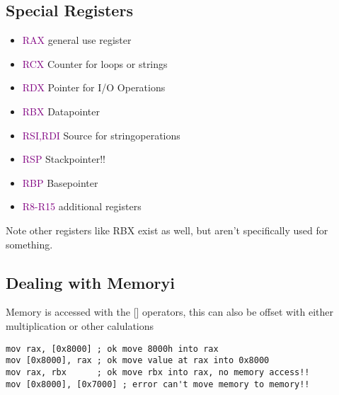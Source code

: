 \documentclass[main.tex,fontsize=8pt,paper=a4,paper=landscape,DIV=calc,]{scrartcl}
\begin{document}
\begin{multicols*}{4}
\subsection{Special Registers}
\begin{itemize}
  \item \textcolor{purple}{RAX} general use register
  \item \textcolor{purple}{RCX} Counter for loops or strings
  \item \textcolor{purple}{RDX} Pointer for I/O Operations
  \item \textcolor{purple}{RBX} Datapointer
  \item \textcolor{purple}{RSI,RDI} Source for stringoperations
  \item \textcolor{purple}{RSP} Stackpointer!!
  \item \textcolor{purple}{RBP} Basepointer
  \item \textcolor{purple}{R8-R15} additional registers
\end{itemize}
Note other registers like RBX exist as well, but aren't specifically used for something.

\subsection{Dealing with Memoryi}
Memory is accessed with the [] operators, this can also be offset with either multiplication or other calulations
\begin{lstlisting}
mov rax, [0x8000] ; ok move 8000h into rax
mov [0x8000], rax ; ok move value at rax into 0x8000
mov rax, rbx      ; ok move rbx into rax, no memory access!!
mov [0x8000], [0x7000] ; error can't move memory to memory!!
\end{lstlisting}
\vspace{2mm}


\end{multicols*}
\end{document}
